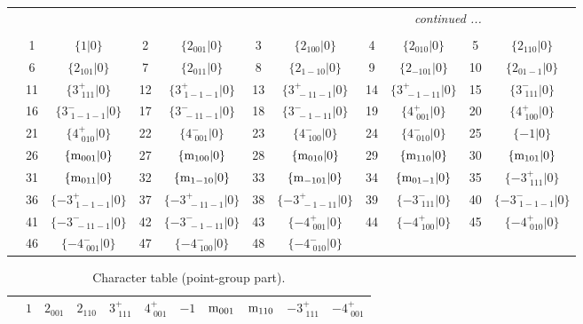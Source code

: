 \documentclass[fleqn,10pt,landscape]{article}
\begin{document}
\begin{itemize}
\begin{center}
\begin{longtable}{c|cc|cc|cc|cc|cc}
 \hline \hline
\multicolumn{10}{r}{\footnotesize\it continued ...} \\ \endfoot

 \hline \hline
\multicolumn{10}{r}{} \\ \endlastfoot

 & 1 & $\{1|0\}$ & 2 & $\{2{}_{001}|0\}$ & 3 & $\{2{}_{100}|0\}$ & 4 & $\{2{}_{010}|0\}$ & 5 & $\{2{}_{110}|0\}$ \\
& 6 & $\{2{}_{101}|0\}$ & 7 & $\{2{}_{011}|0\}$ & 8 & $\{2{}_{1-10}|0\}$ & 9 & $\{2{}_{-101}|0\}$ & 10 & $\{2{}_{01-1}|0\}$ \\
& 11 & $\{3^{+}_{\,\,111}|0\}$ & 12 & $\{3^{+}_{\,\,1-1-1}|0\}$ & 13 & $\{3^{+}_{\,\,-11-1}|0\}$ & 14 & $\{3^{+}_{\,\,-1-11}|0\}$ & 15 & $\{3^{-}_{\,\,111}|0\}$ \\
& 16 & $\{3^{-}_{\,\,1-1-1}|0\}$ & 17 & $\{3^{-}_{\,\,-11-1}|0\}$ & 18 & $\{3^{-}_{\,\,-1-11}|0\}$ & 19 & $\{4^{+}_{\,\,001}|0\}$ & 20 & $\{4^{+}_{\,\,100}|0\}$ \\
& 21 & $\{4^{+}_{\,\,010}|0\}$ & 22 & $\{4^{-}_{\,\,001}|0\}$ & 23 & $\{4^{-}_{\,\,100}|0\}$ & 24 & $\{4^{-}_{\,\,010}|0\}$ & 25 & $\{-1|0\}$ \\
& 26 & $\{{\rm m}_{001}|0\}$ & 27 & $\{{\rm m}_{100}|0\}$ & 28 & $\{{\rm m}_{010}|0\}$ & 29 & $\{{\rm m}_{110}|0\}$ & 30 & $\{{\rm m}_{101}|0\}$ \\
& 31 & $\{{\rm m}_{011}|0\}$ & 32 & $\{{\rm m}_{1-10}|0\}$ & 33 & $\{{\rm m}_{-101}|0\}$ & 34 & $\{{\rm m}_{01-1}|0\}$ & 35 & $\{-3^{+}_{\,\,111}|0\}$ \\
& 36 & $\{-3^{+}_{\,\,1-1-1}|0\}$ & 37 & $\{-3^{+}_{\,\,-11-1}|0\}$ & 38 & $\{-3^{+}_{\,\,-1-11}|0\}$ & 39 & $\{-3^{-}_{\,\,111}|0\}$ & 40 & $\{-3^{-}_{\,\,1-1-1}|0\}$ \\
& 41 & $\{-3^{-}_{\,\,-11-1}|0\}$ & 42 & $\{-3^{-}_{\,\,-1-11}|0\}$ & 43 & $\{-4^{+}_{\,\,001}|0\}$ & 44 & $\{-4^{+}_{\,\,100}|0\}$ & 45 & $\{-4^{+}_{\,\,010}|0\}$ \\
& 46 & $\{-4^{-}_{\,\,001}|0\}$ & 47 & $\{-4^{-}_{\,\,100}|0\}$ & 48 & $\{-4^{-}_{\,\,010}|0\}$ &  &  &  &  \\
\end{longtable}
\end{center}
\begin{center}
\renewcommand{\arraystretch}{1.0}
\begin{longtable}{c|rrrrrrrrrr}
\caption{Character table (point-group part).}
 \\
 \hline \hline
 & $ 1 $ & $ 2{}_{001} $ & $ 2{}_{110} $ & $ 3^{+}_{\,\,111} $ & $ 4^{+}_{\,\,001} $ & $ -1 $ & $ {\rm m}_{001} $ & $ {\rm m}_{110} $ & $ -3^{+}_{\,\,111} $ & $ -4^{+}_{\,\,001} $ \\ \hline \endfirsthead


\end{longtable}
\end{center}
\end{itemize}
\end{document}
